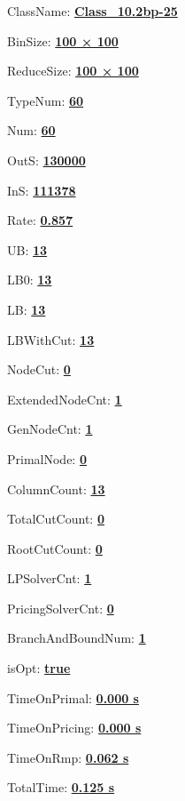 \documentclass[11pt]{article}
\begin{document}
\pagestyle{empty}


ClassName: \underline{\textbf{Class_10.2bp-25}}
\par
BinSize: \underline{\textbf{100 × 100}}
\par
ReduceSize: \underline{\textbf{100 × 100}}
\par
TypeNum: \underline{\textbf{60}}
\par
Num: \underline{\textbf{60}}
\par
OutS: \underline{\textbf{130000}}
\par
InS: \underline{\textbf{111378}}
\par
Rate: \underline{\textbf{0.857}}
\par
UB: \underline{\textbf{13}}
\par
LB0: \underline{\textbf{13}}
\par
LB: \underline{\textbf{13}}
\par
LBWithCut: \underline{\textbf{13}}
\par
NodeCut: \underline{\textbf{0}}
\par
ExtendedNodeCnt: \underline{\textbf{1}}
\par
GenNodeCnt: \underline{\textbf{1}}
\par
PrimalNode: \underline{\textbf{0}}
\par
ColumnCount: \underline{\textbf{13}}
\par
TotalCutCount: \underline{\textbf{0}}
\par
RootCutCount: \underline{\textbf{0}}
\par
LPSolverCnt: \underline{\textbf{1}}
\par
PricingSolverCnt: \underline{\textbf{0}}
\par
BranchAndBoundNum: \underline{\textbf{1}}
\par
isOpt: \underline{\textbf{true}}
\par
TimeOnPrimal: \underline{\textbf{0.000 s}}
\par
TimeOnPricing: \underline{\textbf{0.000 s}}
\par
TimeOnRmp: \underline{\textbf{0.062 s}}
\par
TotalTime: \underline{\textbf{0.125 s}}
\par
\newpage


\end{document}
